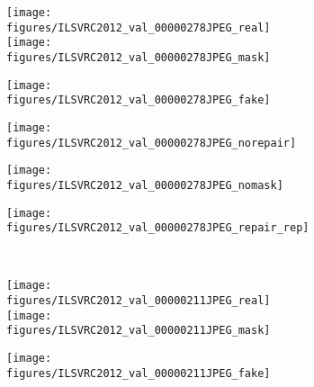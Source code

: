 \documentclass[10pt,twocolumn,letterpaper]{article}
\begin{document}
\begin{figure}[t]
\begin{center}
\begin{subfigure}[h]{0.195\linewidth}
	\texttt{[image: figures/ILSVRC2012\_val\_00000278JPEG\_real]}%
\hspace{-\linewidth}\texttt{[image: figures/ILSVRC2012\_val\_00000278JPEG\_mask]}%
\end{subfigure}\hspace{.4mm}%
\begin{subfigure}[h]{0.195\linewidth}
	\texttt{[image: figures/ILSVRC2012\_val\_00000278JPEG\_fake]}%
\end{subfigure}\hspace{.4mm}%
\begin{subfigure}[h]{0.195\linewidth}
	\texttt{[image: figures/ILSVRC2012\_val\_00000278JPEG\_norepair]}%
\end{subfigure}\hspace{.4mm}%
\begin{subfigure}[h]{0.195\linewidth}
	\texttt{[image: figures/ILSVRC2012\_val\_00000278JPEG\_nomask]}%
\end{subfigure}\hspace{.4mm}%
\begin{subfigure}[h]{0.195\linewidth}
	\texttt{[image: figures/ILSVRC2012\_val\_00000278JPEG\_repair\_rep]}%
\end{subfigure}\\
\begin{subfigure}[h]{0.195\linewidth}
	\texttt{[image: figures/ILSVRC2012\_val\_00000211JPEG\_real]}%
\hspace{-\linewidth}\texttt{[image: figures/ILSVRC2012\_val\_00000211JPEG\_mask]}%
        \caption{}
\end{subfigure}\hspace{.4mm}%
\begin{subfigure}[h]{0.195\linewidth}
	\texttt{[image: figures/ILSVRC2012\_val\_00000211JPEG\_fake]}%
        \caption{}
\end{subfigure}\hspace{.4mm}%

\end{center}
\end{figure}
\end{document}
